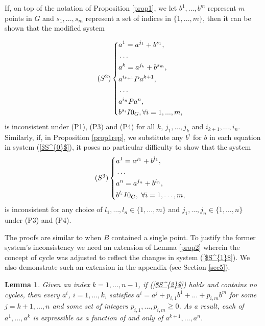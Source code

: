\documentclass[pdflatex,sn-apa,11pt]{sn-jnl}%
\newtheorem{lemma}{Lemma}
\begin{document}
If, on top of the notation of Proposition \ref{prop1}, we let $b^1, ..., b^m$ represent $m$ points in $G$ and $s_1, ..., s_m$ represent a set of indices in $\{1, ..., m\}$, then it can be shown that the modified system

\begin{equation}
\tag{$S^{2}$}
\label{$S^{2}$}
  \left\{
    \begin{aligned}
      & a^1 = a^{j_1} + b^{s_1}, \\
      & \dots \\
      & a^k = a^{j_k} + b^{s_m}, \\
      & a^{i_{k+1}}Pa^{k+1}, \\
      & \dots \\
      & a^{i_{n}}Pa^{n}, \\
      & b^{s_i}I{0_G}, \forall i = 1, ..., m,
    \end{aligned}
  \right.
\end{equation}is inconsistent under (P1), (P3) and (P4) for all $k$, $j_1, ..., j_k$ and $i_{k+1}, ..., i_{n}$. Similarly, if, in Proposition \ref{prop1rep}, we substitute any $b^i$ for $b$ in each equation in system (\ref{$S^{0}$}), it poses no particular difficulty to show that the system 
\begin{equation}
\tag{$S^{3}$}
\label{$S^{3}$}
  \left\{
    \begin{aligned}
      & a^1 = a^{j_1} + b^{l_1}, \\
  & \dots \\
      & a^n = a^{j_n} + b^{l_n}, \\
      & b^{l_i}I{0_G},\ \forall i = 1, \dots, m,
    \end{aligned}
  \right.
\end{equation}
is inconsistent for any choice of $l_1, \dots, l_n \in \{1, \dots, m\}$ and $j_1, \dots, j_n \in \{1, \dots, n\}$ under (P3) and (P4).

The proofs are similar to when $B$ contained a single point. To justify the former system's inconsistency we need an extension of Lemma \ref{prop2} wherein the concept of cycle was adjusted to reflect the changes in system (\ref{$S^{1}$}). We also demonstrate such an extension in the appendix (see Section \ref{sec5}).

\begin{lemma}
\label{prop3}
Given an index $k = 1, ..., n-1$, if (\ref{$S^{2}$}) holds and contains no cycles, then every $a^{i}$, $i = 1, ..., k$, satisfies $a^{i} = a^{j} + p_{i, 1}b^{1} + ... + p_{i, m}b^{m}$ for some $j = k+1, ..., n$ and some set of integers $p_{i, 1}, ..., p_{i, m} \geqq 0$. As a result, each of $a^1, ..., a^{k}$ is expressible as a function of and only of $a^{k+1}, ..., a^{n}$.
\end{lemma}
\end{document}
